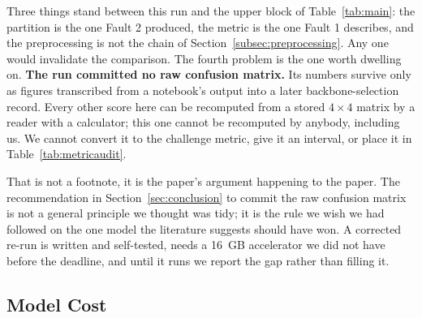 \documentclass[journal,onecolumn]{IEEEtran}
\begin{document}
Three things stand between this run and the upper block of Table~\ref{tab:main}: the partition
is the one Fault 2 produced, the metric is the one Fault 1 describes, and the preprocessing is
not the chain of Section~\ref{subsec:preprocessing}. Any one would invalidate the comparison.
The fourth problem is the one worth dwelling on. \textbf{The run committed no raw confusion
matrix.} Its numbers survive only as figures transcribed from a notebook's output into a later
backbone-selection record. Every other score here can be recomputed from a stored $4\times4$
matrix by a reader with a calculator; this one cannot be recomputed by anybody, including us.
We cannot convert it to the challenge metric, give it an interval, or place it in
Table~\ref{tab:metricaudit}.

That is not a footnote, it is the paper's argument happening to the paper. The recommendation
in Section~\ref{sec:conclusion} to commit the raw confusion matrix is not a general principle
we thought was tidy; it is the rule we wish we had followed on the one model the literature
suggests should have won. A corrected re-run is written and self-tested, needs a 16~GB
accelerator we did not have before the deadline, and until it runs we report the gap rather
than filling it.

\subsection{Model Cost}
\label{subsec:efficiency}
\end{document}
